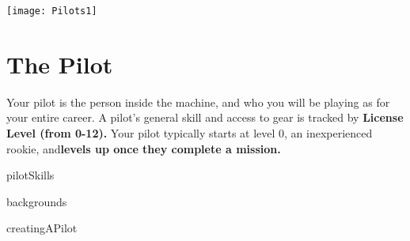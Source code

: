 \newpage
\begin{center}
    \texttt{[image: Pilots1]}
\end{center}

\chapter{The Pilot}

Your pilot is the person inside the machine, and who you will be playing as for your entire career.
A pilot’s general skill and access to gear is tracked by \textbf{License Level (from 0-12).} Your pilot
typically starts at level 0, an inexperienced rookie, and\textbf{levels up once they complete a mission.} 

{pilotSkills}

{backgrounds}

{creatingAPilot}
